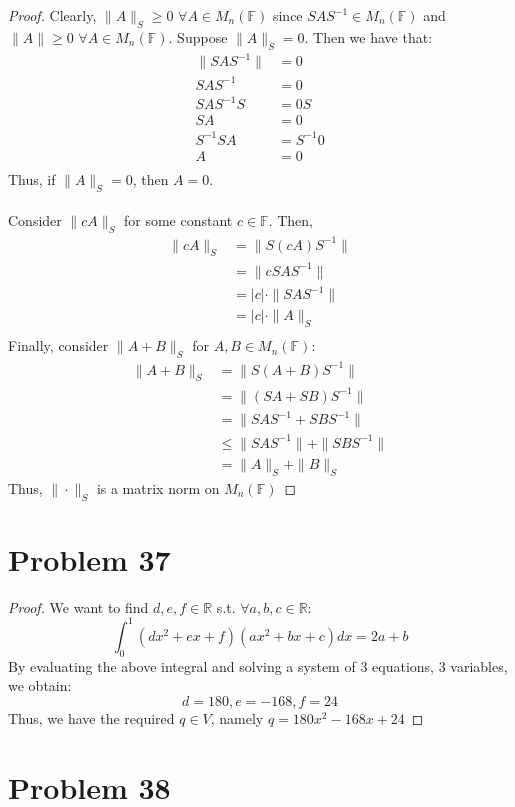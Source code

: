 \documentclass{article}
\begin{document}
\begin{proof}
Clearly, $\|A\|_S \geq 0$ $\forall A \in M_n(\mathbb{F})$ since $SAS^{-1} \in M_n(\mathbb{F})$ and $\|A\| \geq 0$ $\forall A \in M_n(\mathbb{F})$. Suppose $\|A\|_S = 0$. Then we have that:
\begin{align*}
\|SAS^{-1}\| &= 0 \\
SAS^{-1} &= 0 \\
SAS^{-1}S &= 0S \\
SA &= 0 \\
S^{-1}SA &= S^{-1}0 \\
A &= 0 \\
\end{align*}
Thus, if $\|A\|_S = 0$, then $A = 0$.\\
\\
Consider $\|cA\|_S$ for some constant $c \in \mathbb{F}$. Then,
\begin{align*}
\|cA\|_S &= \|S(cA)S^{-1}\| \\
&= \|cSAS^{-1}\| \\
&= \lvert c \rvert \cdot \|SAS^{-1}\| \\
&= \lvert c \rvert \cdot \|A\|_S \\
\end{align*}
Finally, consider $\|A + B\|_S$ for $A, B \in M_n(\mathbb{F})$:
\begin{align*}
\|A + B\|_S &= \|S(A + B)S^{-1}\| \\
&= \|(SA + SB)S^{-1}\| \\
&= \|SAS^{-1} + SBS^{-1}\| \\
&\leq \|SAS^{-1}\| + \|SBS^{-1}\| \\
&= \|A\|_S + \|B\|_S
\end{align*}
Thus, $\| \cdot \|_S$ is a matrix norm on $M_n(\mathbb{F})$
\end{proof}


\section*{Problem 37}
\begin{proof}
We want to find $d, e, f \in \mathbb{R}$ s.t. $\forall a, b, c \in \mathbb{R}$:
$$\int_0^1 (dx^2 + ex + f)(ax^2 + bx + c) dx = 2a + b$$
By evaluating the above integral and solving a system of 3 equations, 3 variables, we obtain:
$$d = 180, e = -168, f = 24$$
Thus, we have the required $q \in V$, namely $q = 180x^2 - 168x + 24$
\end{proof}


\section*{Problem 38}
\end{document}
